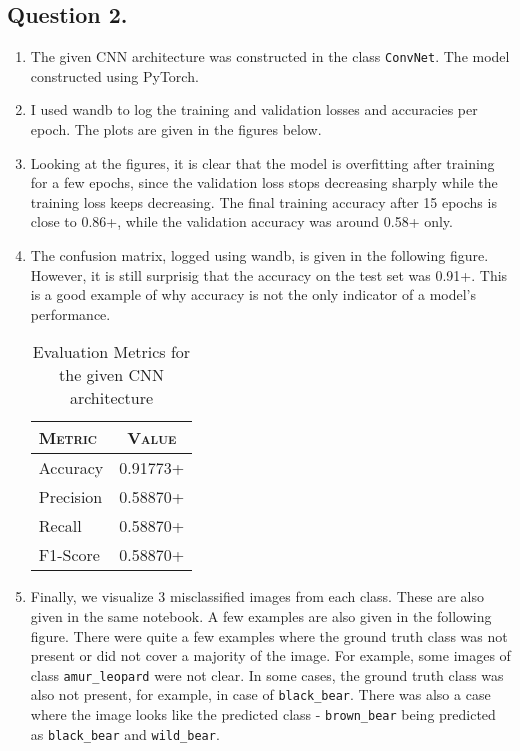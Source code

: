 \documentclass[10pt]{article}
\begin{document}
    \subsection*{\textbf{Question 2.}}
    \begin{enumerate}[label=(\alph*)]
        \item The given CNN architecture was constructed in the class
        \texttt{ConvNet}. The model constructed using PyTorch.
        \item I used wandb to log the training and validation losses and accuracies
        per epoch. The plots are given in the figures below.
        \item Looking at the figures, it is clear that the model is overfitting after
        training for a few epochs, since the validation loss stops decreasing sharply
        while the training loss keeps decreasing. The final training accuracy after 15
        epochs is close to 0.86+, while the validation accuracy was around 0.58+ only.
        \item The confusion matrix, logged using wandb, is given in the following figure.
        However, it is still surprisig that the accuracy on the test set was 0.91+. This
        is a good example of why accuracy is not the only indicator of a model's performance.
        \begin{table}[h!]
            \centering
            \begin{tabular}{l|c}
                \textsc{Metric} & \textsc{Value} \\
                \hline
                Accuracy & 0.91773+ \\
                Precision & 0.58870+ \\
                Recall & 0.58870+ \\
                F1-Score & 0.58870+
            \end{tabular}
            \caption{Evaluation Metrics for the given CNN architecture}
        \end{table}
        \item Finally, we visualize 3 misclassified images from each class. These
        are also given in the same notebook. A few examples are also given in the
        following figure. There were quite a few examples where the ground truth
        class was not present or did not cover a majority of the image. For example,
        some images of class \texttt{amur\_leopard} were not clear. In some cases,
        the ground truth class was also not present, for example, in case of
        \texttt{black\_bear}. There was also a case where the image looks like the
        predicted class - \texttt{brown\_bear} being predicted as \texttt{black\_bear}
        and \texttt{wild\_bear}.
    \end{enumerate}
\end{document}
